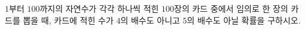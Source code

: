 $1$부터 $100$까지의 자연수가 각각 하나씩 적힌 $100$장의 카드 중에서 임의로 한 장의 카드를 뽑을 때, 카드에 적힌 수가 $4$의 배수도 아니고 $5$의 배수도 아닐 확률을 구하시오.
